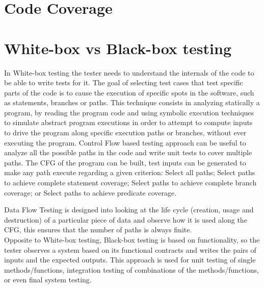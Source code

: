 {\section{Code Coverage}
}
\section{White-box vs Black-box testing}
In White-box testing the tester needs to understand the internals of
the code to be able to write tests for it.
The goal of selecting test cases that test specific parts of the code
is to cause the execution of specific spots in the software, such as
statements, branches or
paths.
This technique consists in analyzing statically a program, by reading
the program code and using symbolic execution techniques to simulate
abstract program
executions in order to attempt to compute inputs to drive the program
along specific execution paths or branches, without ever executing the
program. Control Flow based testing approach can be useful to analyze all the
possible paths in the code and write unit tests to cover multiple paths.
The \ac{CFG} of the program can be built,
test inputs can be generated to make any path execute regarding a given criterion:
Select all paths;
Select paths to achieve complete statement
coverage\cite{stt,Ntafos:1988:CST:630792.631017};
Select paths to achieve complete branch coverage\cite{Roper1994,stt};
or Select paths to achieve predicate
coverage\cite{stt,Ntafos:1988:CST:630792.631017}.

Data Flow Testing is designed into looking at the life cycle
(creation, usage and destruction) of a particular
piece of data and observe how it is used along the \ac{CFG}, this ensures
that the number of paths is always finite\cite{dataflow}.\\

Opposite to White-box testing, Black-box testing is based on
functionality, so the tester observes a system based
on its functional contracts and writes the pairs of inputs and the
expected outputs.
This approach is used for unit testing of single methods/functions,
integration testing
of combinations of the methods/functions, or even final system testing.\\


